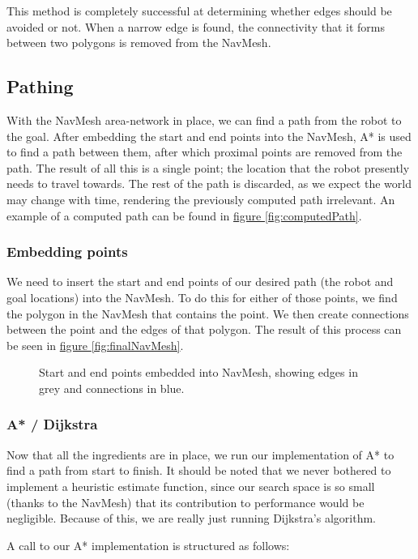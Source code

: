 \documentclass[10pt,twocolumn]{scrartcl}
\newcommand{\fref}[1]{\hyperref[#1]{figure \vref{#1}}}
\begin{document}
This method is completely successful at determining whether edges should be avoided or not. When a narrow edge is found, the connectivity that it forms between two polygons is removed from the NavMesh.

\subsection{Pathing}
With the NavMesh area-network in place, we can find a path from the robot to the goal. After embedding the start and end points into the NavMesh, A* is used to find a path between them, after which proximal points are removed from the path. The result of all this is a single point; the location that the robot presently needs to travel towards. The rest of the path is discarded, as we expect the world may change with time, rendering the previously computed path irrelevant. An example of a computed path can be found in \fref{fig:computedPath}.

\subsubsection{Embedding points}
We need to insert the start and end points of our desired path (the robot and goal locations) into the NavMesh. To do this for either of those points, we find the polygon in the NavMesh that contains the point. We then create connections between the point and the edges of that polygon. The result of this process can be seen in \fref{fig:finalNavMesh}.

\begin{figure}
	\centering
	
	\caption{Start and end points embedded into NavMesh, showing edges in grey and connections in blue.}
	\label{fig:finalNavMesh}
\end{figure}

\subsubsection{A* / Dijkstra}

Now that all the ingredients are in place, we run our implementation of A* to find a path from start to finish. It should be noted that we never bothered to implement a heuristic estimate function, since our search space is so small (thanks to the NavMesh) that its contribution to performance would be negligible. Because of this, we are really just running Dijkstra's algorithm.

A call to our A* implementation is structured as follows:
\end{document}
